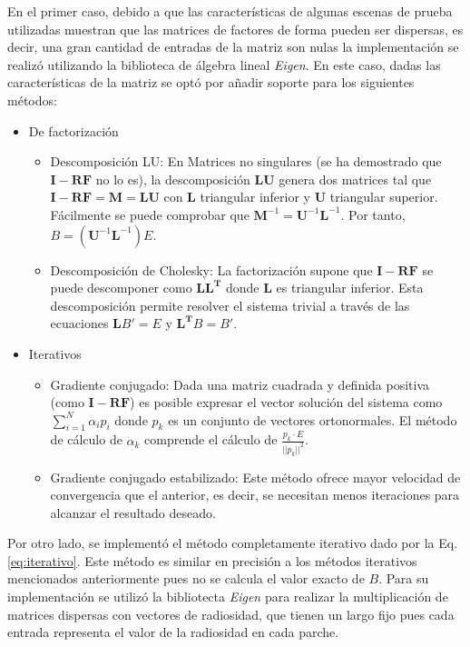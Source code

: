 En el primer caso, debido a que las características de algunas escenas de prueba utilizadas muestran que las matrices de factores de forma pueden ser dispersas, es decir, una gran cantidad de entradas de la matriz son nulas la implementación se realizó utilizando la biblioteca de álgebra lineal \textit{Eigen}. En este caso, dadas las características de la matriz se optó por añadir soporte para los siguientes métodos:

\begin{itemize}
	\item{De factorización}
		\begin{itemize}
			\item{Descomposición LU:} En Matrices no singulares (se ha demostrado que $\mathbf{I - RF}$ no lo es), la descomposición $\mathbf{LU}$ genera dos matrices tal que $\mathbf{I - RF} = \mathbf{M} = \mathbf{LU}$ con $\mathbf{L}$ triangular inferior y $\mathbf{U}$ triangular superior. Fácilmente se puede comprobar que  $\mathbf{M}^{-1} = \mathbf{U}^{-1} \mathbf{L}^{-1}$. Por tanto, $B =(\mathbf{U}^{-1} \mathbf{L}^{-1})E$. 
			\item{Descomposición de Cholesky:} La factorización supone que  $\mathbf{I - RF}$ se puede descomponer como  $\mathbf{LL^{T}}$ donde  $\mathbf{L}$ es triangular inferior. Esta descomposición permite resolver el sistema trivial a través de las ecuaciones $\mathbf{L}B' = E$ y $\mathbf{L^{T}}B = B'$.
			\end{itemize}
	\item{Iterativos}
			\begin{itemize}
			\item Gradiente conjugado:
				Dada una matriz cuadrada y definida positiva (como $\mathbf{I - RF}$) es posible expresar el vector solución del sistema como $\sum_{i=1}^{N} \alpha_{i}p_{i}$ donde $p_{k}$ es un conjunto de vectores ortonormales. El método de cálculo de $\alpha_{k}$ comprende el cálculo de $\frac{p_{k} \cdot E}{||p_{k}||^{2}}$.			\item Gradiente conjugado estabilizado: Este método ofrece mayor velocidad de convergencia que el anterior, es decir, se necesitan menos iteraciones para alcanzar el resultado deseado. 
		\end{itemize}
\end{itemize}

Por otro lado, se implementó el método completamente iterativo dado por la Eq. \eqref{eq:iterativo}. Este método es similar en precisión a los métodos iterativos  mencionados anteriormente pues no se calcula el valor exacto de $B$. Para su implementación se utilizó la bibliotecta \textit{Eigen} para realizar la multiplicación de matrices dispersas con vectores de radiosidad, que tienen un largo fijo pues cada entrada representa el valor de la radiosidad en cada parche.

